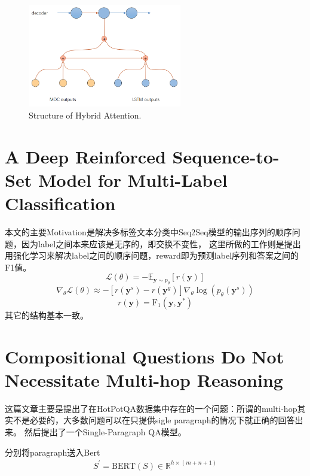 \documentclass[a4paper,UTF8]{article}
\numberwithin{equation}{section}
\begin{document}
\begin{figure}[H]
	\centering
	\includegraphics[width=0.6\textwidth]{2-2.png}
	\caption{Structure of Hybrid Attention.}
\end{figure}

\newpage
\section{A Deep Reinforced Sequence-to-Set Model for Multi-Label Classification}
本文的主要Motivation是解决多标签文本分类中Seq2Seq模型的输出序列的顺序问题，因为label之间本来应该是无序的，即交换不变性，
这里所做的工作则是提出用强化学习来解决label之间的顺序问题，reward即为预测label序列和答案之间的F1值。
\begin{equation}
	\mathcal{L}(\theta)=-\mathbb{E}_{\boldsymbol{y} \sim p_{\theta}}[r(\boldsymbol{y})]
	\end{equation}
	\begin{equation}
		\nabla_{\theta} \mathcal{L}(\theta) \approx-\left[r\left(\boldsymbol{y}^{s}\right)-r\left(\boldsymbol{y}^{g}\right)\right] \nabla_{\theta} \log \left(p_{\theta}\left(\boldsymbol{y}^{s}\right)\right)
		\end{equation}
		\begin{equation}
			r(\boldsymbol{y})=\mathrm{F}_{1}\left(\boldsymbol{y}, \boldsymbol{y}^{*}\right)
			\end{equation}
其它的结构基本一致。

\section{Compositional Questions Do Not Necessitate Multi-hop Reasoning}
这篇文章主要是提出了在HotPotQA数据集中存在的一个问题：所谓的multi-hop其实不是必要的，大多数问题可以在只提供sigle paragraph的情况下就正确的回答出来。
然后提出了一个Single-Paragraph QA模型。

分别将paragraph送入Bert
\begin{align}
	S^{\prime}=\mathrm{BERT}(S) \in \mathbb{R}^{h \times(m+n+1)}
	\end{align}
	
\end{document}
